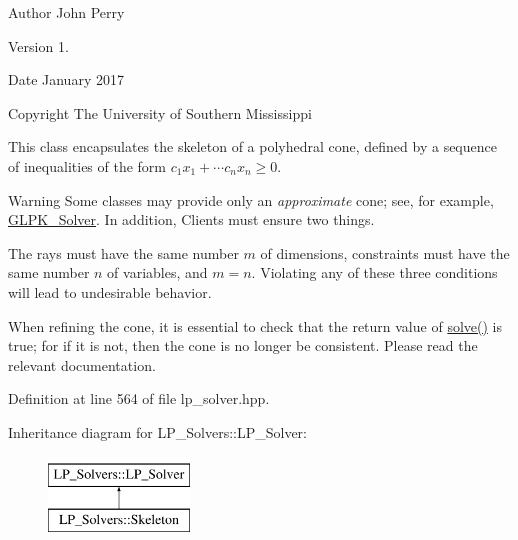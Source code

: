 \begin{DoxyAuthor}{Author}
John Perry 
\end{DoxyAuthor}
\begin{DoxyVersion}{Version}
1. 
\end{DoxyVersion}
\begin{DoxyDate}{Date}
January 2017 
\end{DoxyDate}
\begin{DoxyCopyright}{Copyright}
The University of Southern Mississippi
\end{DoxyCopyright}
This class encapsulates the skeleton of a polyhedral cone, defined by a sequence of inequalities of the form $ c_1 x_1 + \cdots c_n x_n \geq 0 $.

\begin{DoxyWarning}{Warning}
Some classes may provide only an {\itshape approximate} cone; see, for example, \hyperlink{group___c_l_s_solvers_class_l_p___solvers_1_1_g_l_p_k___solver}{G\+L\+P\+K\+\_\+\+Solver}. In addition, Clients must ensure two things.
\begin{DoxyEnumerate}
\item The rays must have the same number $ m $ of dimensions, constraints must have the same number $ n $ of variables, and $ m=n $. Violating any of these three conditions will lead to undesirable behavior.
\item When refining the cone, it is essential to check that the return value of \hyperlink{group___c_l_s_solvers_a8b9979fb228ac9ccfe037ad6ca48b314}{solve()} is {\ttfamily true}; for if it is not, then the cone is no longer be consistent. Please read the relevant documentation. 
\end{DoxyEnumerate}
\end{DoxyWarning}


Definition at line 564 of file lp\+\_\+solver.\+hpp.

Inheritance diagram for L\+P\+\_\+\+Solvers\+:\+:L\+P\+\_\+\+Solver\+:\begin{figure}[H]
\begin{center}
\leavevmode
\includegraphics[height=2.000000cm]{group___c_l_s_solvers}
\end{center}
\end{figure}
